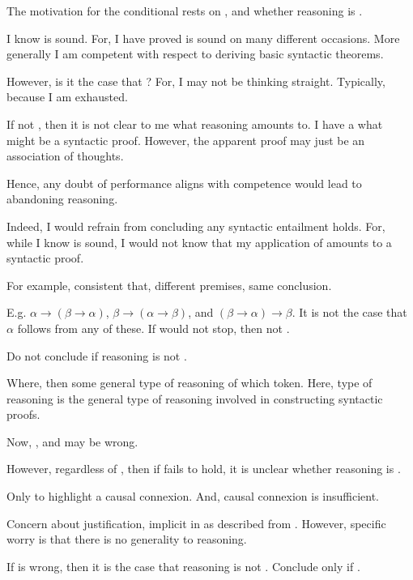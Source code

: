 \begin{note}
  The motivation for the conditional rests on \gR{}, and whether reasoning is \sR{}.

  I know \sqE{} is sound.
  For, I have proved \sqE{} is sound on many different occasions.
  More generally I am competent with respect to deriving basic syntactic theorems.

  However, is it the case that \sR{}?
  For, I may not be thinking straight.
  Typically, because I am exhausted.

  If not \sR{}, then it is not clear to me what reasoning amounts to.
  I have a what might be a syntactic proof.
  However, the apparent proof may just be an association of thoughts.

  Hence, any doubt of performance aligns with competence would lead to abandoning reasoning.

  Indeed, I would refrain from concluding any syntactic entailment holds.
  For, while I know \sqE{} is sound, I would not know that my application of \sqE{} amounts to a syntactic proof.

  For example, consistent that, different premises, same conclusion.

  E.g. \(\alpha \rightarrow (\beta \rightarrow \alpha)\), \(\beta \rightarrow (\alpha \rightarrow \beta)\), and \((\beta \rightarrow \alpha) \rightarrow \beta\).
  It is not the case that \(\alpha\) follows from any of these.
  If would not stop, then not \sR{}.

  Do not conclude if reasoning is not \sR{}.

  Where, \sR{} then some general type of reasoning of which token.
  Here, type of reasoning is the general type of reasoning involved in constructing syntactic proofs.
\end{note}

\begin{note}
  Now, , and  may be wrong.

  However, regardless of , then if \requ{} fails to hold, it is unclear whether reasoning is \sR{}.

  Only to highlight a causal connexion.
  And, causal connexion is insufficient.

  Concern about justification, implicit in  as described from .
  However, specific worry is that there is no generality to reasoning.

  If  is wrong, then it is the case that reasoning is not \sR{}.
  Conclude only if \sR{}.
\end{note}

